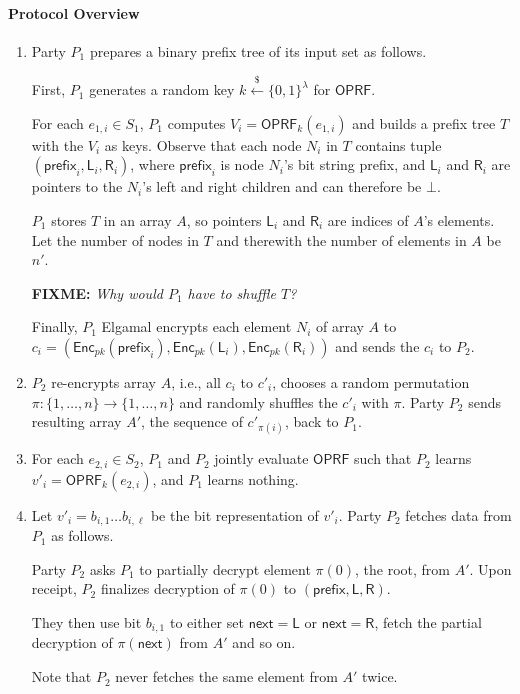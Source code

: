 \documentclass{article}
\newcommand{\oprf}[0]{\mathsf{OPRF}}
\newcommand{\getr}[0]{\stackrel{\$}{\leftarrow}}
\newcommand{\enc}[0]{{\mathsf{Enc}}}
\newcommand{\fixme}[1]{{\bf FIXME:} {\emph{#1}}}
\begin{document}
\paragraph{Protocol Overview}
\begin{enumerate}[label={\bf Step {\arabic*}:},leftmargin=*]
\item Party $P_1$ prepares a binary prefix tree of its input set as follows.

  First, $P_1$ generates a random key $k\getr\{0,1\}^\lambda$ for $\oprf$.

  For each $e_{1,i}\in{}S_1$, $P_1$ computes $V_i=\oprf_k(e_{1,i})$
  and builds a prefix tree $T$ with the $V_i$ as keys. Observe that
  each node $N_i$ in $T$ contains tuple
  $(\mathsf{prefix}_i,\mathsf{L}_i,\mathsf{R}_i)$, where
  $\mathsf{prefix}_i$ is node $N_i$'s bit string prefix, and
  $\mathsf{L}_i$ and $\mathsf{R}_i$ are pointers to the $N_i$'s left
  and right children and can therefore be $\bot$.

  $P_1$ stores $T$ in an array $A$, so pointers $\mathsf{L}_i$ and
  $\mathsf{R}_i$ are indices of $A$'s elements. Let the number
  of nodes in $T$ and therewith the number of elements in $A$ be
  $n'$.

  \fixme{Why would $P_1$ have to shuffle $T$?}
  
  Finally, $P_1$ Elgamal encrypts each element $N_i$ of array $A$ to
  $c_i=(\enc_{pk}(\mathsf{prefix}_i),\enc_{pk}(\mathsf{L}_i),\enc_{pk}(\mathsf{R}_i))$
  and sends the $c_i$ to $P_2$.

\item $P_2$ re-encrypts array $A$, i.e., all $c_i$ to $c'_i$, chooses
  a random permutation $\pi:\{1,\ldots,n\}\rightarrow\{1,\ldots,n\}$
  and randomly shuffles the $c'_i$ with $\pi$. Party $P_2$ sends
  resulting array $A'$, the sequence of $c'_{\pi(i)}$, back to $P_1$.

\item For each $e_{2,i}\in{}S_2$, $P_1$ and $P_2$ jointly evaluate
  $\oprf$ such that $P_2$ learns $v'_i=\oprf_k(e_{2,i})$, and $P_1$
  learns nothing.

\item Let $v'_i=b_{i,1}\ldots{}b_{i,\ell}$ be the bit representation
  of $v'_i$. Party $P_2$ fetches data from $P_1$ as follows.

  Party $P_2$ asks $P_1$ to partially decrypt element $\pi(0)$, the
  root, from $A'$. Upon receipt, $P_2$ finalizes decryption of
  $\pi(0)$ to $(\mathsf{prefix},\mathsf{L},\mathsf{R})$.

  They then use bit $b_{i,1}$ to either set
  ${\mathsf{next}}=\mathsf{L}$ or ${\mathsf{next}}=\mathsf{R}$, fetch
  the partial decryption of $\pi({\mathsf{next}})$ from $A'$ and so on.

  Note that $P_2$ never fetches the same element from $A'$ twice. 
  
\end{enumerate}
\end{document}
